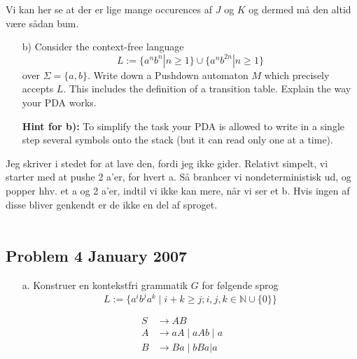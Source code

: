Vi kan her se at der er lige mange occurences af $J$ og $K$ og dermed må den altid være sådan bum.

\begin{enumerate}
	\item[b)] Consider the context-free language
		\[
			L := \{a^n b^n | n \geq 1\} \cup \{a^n b^{2n} | n \geq 1\}
		\]
		over \( \Sigma = \{a, b\} \).
		Write down a Pushdown automaton \( M \) which precisely accepts \( L \). This includes the definition of a transition table. Explain the way your PDA works.

		\textbf{Hint for b):} To simplify the task your PDA is allowed to write in a single step several symbols onto the stack (but it can read only one at a time).
\end{enumerate}

Jeg skriver i stedet for at lave den, fordi jeg ikke gider. Relativt simpelt, vi starter med at pushe 2 a'er, for hvert a. Så branhcer vi nondeterministisk ud, og popper hhv. et a og 2 a'er, indtil vi ikke kan mere, når vi ser et b. Hvis ingen af disse bliver genkendt er de ikke en del af sproget.\\\\

\noindent
\subsection*{Problem 4 January 2007}
\noindent

\begin{enumerate}
	\item[a.] Konstruer en kontekstfri grammatik $G$ for følgende sprog
		\[L := \{a^{i}b^{j}a^{k} \mid i+k \ge j; i,j,k \in \mathbb{N} \cup \{0\}\}\]
\end{enumerate}

\begin{equation*}
	\begin{split}
		S &\rightarrow AB\\
		A &\rightarrow aA \mid aAb \mid a \\
		B &\rightarrow Ba \mid bBa | a \\
	\end{split}
\end{equation*}

